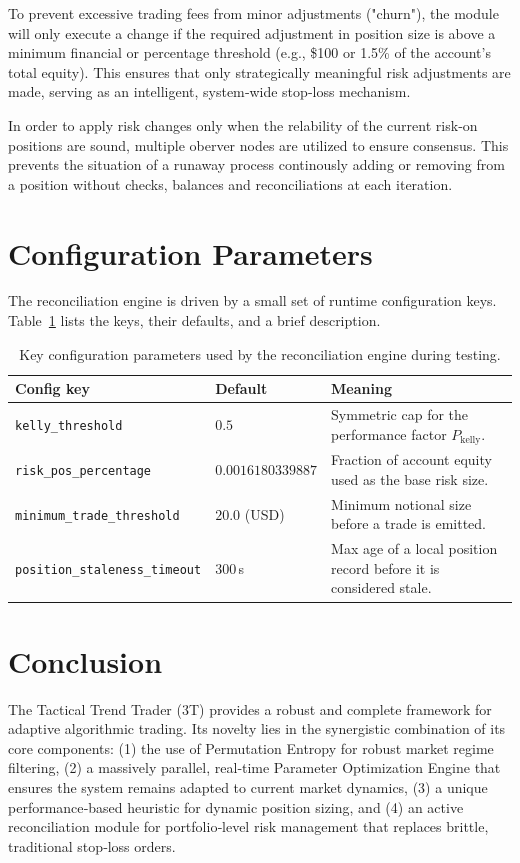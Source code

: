 \documentclass[10pt]{article}
\begin{document}
To prevent excessive trading fees from minor adjustments ("churn"), the module will only execute a change if the required adjustment in position size is above a minimum financial or percentage threshold (e.g., \$100 or 1.5\% of the account's total equity). This ensures that only strategically meaningful risk adjustments are made, serving as an intelligent, system‑wide stop‑loss mechanism. 

In order to apply risk changes only when the relability of the current risk‑on positions are sound, multiple oberver nodes are utilized to ensure consensus.\cite{lamport1982byzantine} This prevents the situation of a runaway process continously adding or removing from a position without checks, balances and reconciliations at each iteration.

\section{Configuration Parameters}
The reconciliation engine is driven by a small set of runtime configuration keys. Table~\ref{tab:config} lists the keys, their defaults, and a brief description.

\begin{table}[t] %
\small
\centering
\caption{Key configuration parameters used by the reconciliation engine during testing.}
\label{tab:config}
\begin{tabularx}{\textwidth}{@{} l l >{\raggedright\arraybackslash}X @{}}
\toprule
\textbf{Config key} & \textbf{Default} & \textbf{Meaning} \\ \midrule
\texttt{kelly\_threshold} & $0.5$ & Symmetric cap for the performance factor $P_{\text{kelly}}$. \\
\texttt{risk\_pos\_percentage} & $0.0016180339887$ & Fraction of account equity used as the base risk size. \\
\texttt{minimum\_trade\_threshold} & $20.0$ (USD) & Minimum notional size before a trade is emitted. \\
\texttt{position\_staleness\_timeout} & $300$\,s & Max age of a local position record before it is considered stale. \\
\end{tabularx}
\end{table}

\section{Conclusion}
The Tactical Trend Trader (3T) provides a robust and complete framework for adaptive algorithmic trading. Its novelty lies in the synergistic combination of its core components: (1) the use of Permutation Entropy for robust market regime filtering, (2) a massively parallel, real‑time Parameter Optimization Engine that ensures the system remains adapted to current market dynamics, (3) a unique performance‑based heuristic for dynamic position sizing, and (4) an active reconciliation module for portfolio‑level risk management that replaces brittle, traditional stop‑loss orders.
\end{document}
